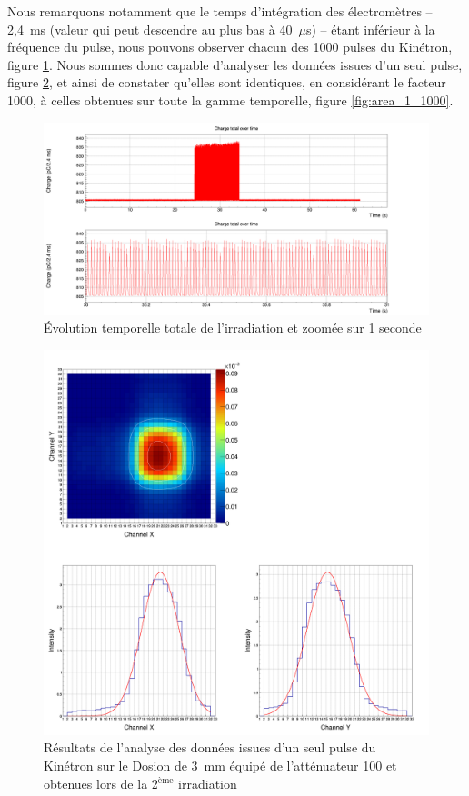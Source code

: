 \documentclass[a4paper,11pt]{article}
\begin{document}
Nous remarquons notamment que le temps d'intégration des électromètres -- 2,4~ms (valeur qui peut descendre au plus bas à 40~$\mu$s) -- étant inférieur à la fréquence du pulse, nous pouvons observer chacun des 1000 pulses du Kinétron, figure \ref{fig:charge}.
Nous sommes donc capable d'analyser les données issues d'un seul pulse, figure \ref{fig:area_1_1}, et ainsi de constater qu'elles sont identiques, en considérant le facteur 1000, à celles obtenues sur toute la gamme temporelle, figure \ref{fig:area_1_1000}.
\begin{figure}[h]
\begin{center}
\includegraphics[width=\linewidth]{Charge.png} 
\caption{\label{fig:charge}\footnotesize{\'Evolution temporelle totale de l'irradiation et zoomée sur 1 seconde}}
\end{center}
\end{figure}

\begin{figure}[h]
\begin{center}
\includegraphics[width=\linewidth]{Area_1_1.png} 
\caption{\label{fig:area_1_1}\footnotesize{Résultats de l'analyse des données issues d'un seul pulse du Kinétron sur le Dosion de 3~mm équipé de l'atténuateur 100 et obtenues lors de la 2$^{\text{ème}}$ irradiation}}
\end{center}
\end{figure}
\end{document}
